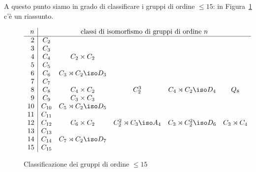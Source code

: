 
A questo punto siamo in grado di classificare i gruppi di ordine $\le 15$: in Figura~\ref{fig:GruppiOrdineLe15} c'è un riassunto.
%
\begin{figure}
\[
\begin{array}{r|ccccc}
n & \multicolumn{5}{c}{\text{classi di isomorfismo di gruppi di ordine $n$}} \\ \hline
2 & C_2 & & & & \\
3 & C_3 & & & & \\
4 & C_4 & C_2 \times C_2 & & & \\
5 & C_5 & & & & \\
6 & C_6 & C_3\rtimes C_2\iso D_3 & & & \\
7 & C_7 & & & & \\
8 & C_8 & C_4\times C_2 & C_2^3 & C_4\rtimes C_2\iso D_4& Q_8 \\
9 & C_9 & C_3 \times C_3 & & & \\
10 & C_{10} & C_5\rtimes C_2\iso D_5 & & & \\
11 & C_{11} & & & & \\
12 & C_{12} & C_6\times C_2 & C_2^2\rtimes C_3\iso A_4 & C_3\rtimes C_2^2\iso D_6 & C_3\rtimes C_4 \\
13 & C_{13} & & & & \\
14 & C_{14} & C_7\rtimes C_2\iso D_7 & & & \\
15 & C_{15} & & & &
\end{array}
\]
\caption{Classificazione dei gruppi di ordine $\le 15$}
\label{fig:GruppiOrdineLe15}
\end{figure}




